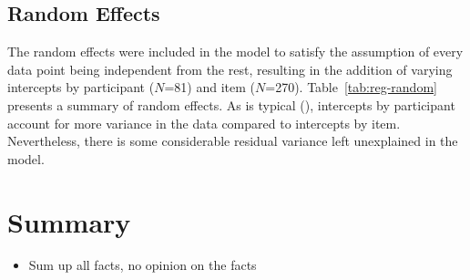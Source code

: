 \subsection{Random Effects}
The random effects were included in the model to satisfy the assumption of every data point being independent from the rest, resulting in the addition of varying intercepts by participant ($N$=81) and item ($N$=270). Table~\ref{tab:reg-random} presents a summary of random effects. As is typical (\cite{Winter+2019}), intercepts by participant account for more variance in the data compared to intercepts by item. Nevertheless, there is some considerable residual variance left unexplained in the model.

\begin{table}[ht]
\centering
{}
\caption[Summary of random effects from the experimental model]{Summary of random effects from the experimental model.}
\label{tab:reg-random}
\end{table}

\section{Summary} \label{sec:stats_summary}
\begin{itemize}
\item Sum up all facts, no opinion on the facts
\end{itemize}
